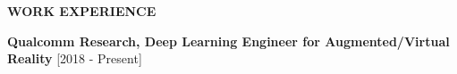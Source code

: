 \documentclass{article}
\def\vsp{4pt}
\begin{document}
\vspace{-3.0mm}

\begin{theorem}
   \vspace{-1.2mm}
\begin{center}
\textbf{ WORK EXPERIENCE
}\end{center}  
\vspace{-0.7mm}    
   \end{theorem}
\vspace{-1mm}
\hspace{2.7mm} \textbf{Qualcomm Research, Deep Learning Engineer for Augmented/Virtual Reality} \hfill{[2018 - Present]}
\end{document}
